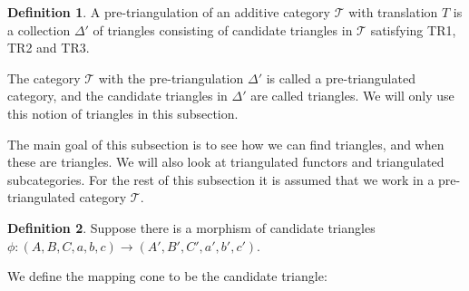 \documentclass[12pt]{article}
\theoremstyle{definition}
\newtheorem{definition}{Definition}[section]
\theoremstyle{remark}
\begin{document}
            \begin{definition}
                A pre-triangulation of an additive category $\mathcal{T}$ with translation $T$ is a collection $\Delta '$ of triangles consisting of candidate triangles in $\mathcal{T}$ satisfying TR1, TR2 and TR3.

                The category $\mathcal{T}$ with the pre-triangulation $\Delta '$ is called a pre-triangulated category, and the candidate triangles in $\Delta '$ are called  triangles. We will only use this notion of triangles in this subsection.
            \end{definition}

            The main goal of this subsection is to see how we can find  triangles, and when these are triangles. We will also look at triangulated functors and triangulated subcategories. For the rest of this subsection it is assumed that we work in a pre-triangulated category $\mathcal{T}$.

            \begin{definition}
                Suppose there is a morphism of candidate triangles $\phi : (A,B,C,a,b,c) \rightarrow (A',B',C',a',b',c')$.
                \begin{center}
                \end{center}
                We define the mapping cone to be the candidate triangle:
                \begin{center}
                \end{center}
            \end{definition}
\end{document}
